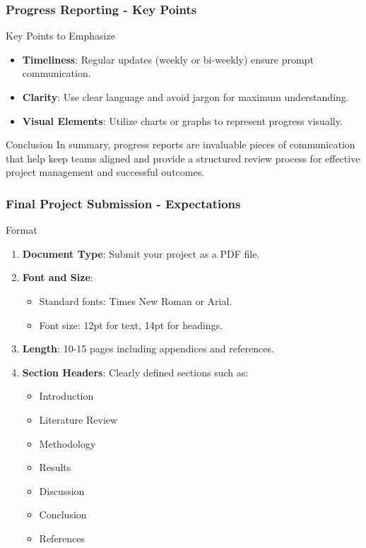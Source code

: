 \documentclass[aspectratio=169]{beamer}
\begin{document}
\begin{frame}[fragile]
  \frametitle{Progress Reporting - Key Points}
  \begin{block}{Key Points to Emphasize}
    \begin{itemize}
      \item \textbf{Timeliness}: Regular updates (weekly or bi-weekly) ensure prompt communication.
      \item \textbf{Clarity}: Use clear language and avoid jargon for maximum understanding.
      \item \textbf{Visual Elements}: Utilize charts or graphs to represent progress visually.
    \end{itemize}
  \end{block}
  
  \begin{block}{Conclusion}
    In summary, progress reports are invaluable pieces of communication that help keep teams aligned and provide a structured review process for effective project management and successful outcomes.
  \end{block}
\end{frame}

\begin{frame}[fragile]
  \frametitle{Final Project Submission - Expectations}
  \begin{block}{Format}
    \begin{enumerate}
      \item \textbf{Document Type}: Submit your project as a PDF file.
      \item \textbf{Font and Size}:
        \begin{itemize}
          \item Standard fonts: Times New Roman or Arial.
          \item Font size: 12pt for text, 14pt for headings.
        \end{itemize}
      \item \textbf{Length}: 10-15 pages including appendices and references.
      \item \textbf{Section Headers}: Clearly defined sections such as:
        \begin{itemize}
          \item Introduction
          \item Literature Review
          \item Methodology
          \item Results
          \item Discussion
          \item Conclusion
          \item References
        \end{itemize}
    \end{enumerate}
  \end{block}
\end{frame}
\end{document}
